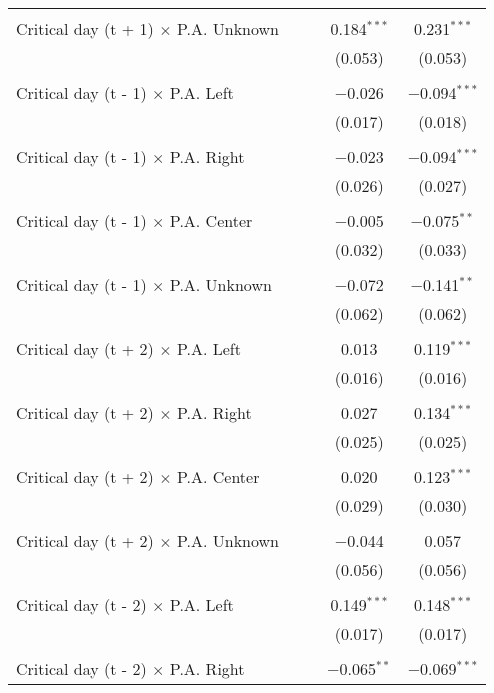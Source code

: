 \documentclass[
]{article}
\begin{document}
\begin{table}[!htbp]
{\begin{tabular}{@{\extracolsep{5pt}}lcccc}
  & & & & \\ 
 Critical day (t + 1) $\times$ P.A. Unknown &  &  & 0.184$^{***}$ & 0.231$^{***}$ \\ 
  &  &  & (0.053) & (0.053) \\ 
  & & & & \\ 
 Critical day (t - 1) $\times$ P.A. Left &  &  & $-$0.026 & $-$0.094$^{***}$ \\ 
  &  &  & (0.017) & (0.018) \\ 
  & & & & \\ 
 Critical day (t - 1) $\times$ P.A. Right &  &  & $-$0.023 & $-$0.094$^{***}$ \\ 
  &  &  & (0.026) & (0.027) \\ 
  & & & & \\ 
 Critical day (t - 1) $\times$ P.A. Center &  &  & $-$0.005 & $-$0.075$^{**}$ \\ 
  &  &  & (0.032) & (0.033) \\ 
  & & & & \\ 
 Critical day (t - 1) $\times$ P.A. Unknown &  &  & $-$0.072 & $-$0.141$^{**}$ \\ 
  &  &  & (0.062) & (0.062) \\ 
  & & & & \\ 
 Critical day (t + 2) $\times$ P.A. Left &  &  & 0.013 & 0.119$^{***}$ \\ 
  &  &  & (0.016) & (0.016) \\ 
  & & & & \\ 
 Critical day (t + 2) $\times$ P.A. Right &  &  & 0.027 & 0.134$^{***}$ \\ 
  &  &  & (0.025) & (0.025) \\ 
  & & & & \\ 
 Critical day (t + 2) $\times$ P.A. Center &  &  & 0.020 & 0.123$^{***}$ \\ 
  &  &  & (0.029) & (0.030) \\ 
  & & & & \\ 
 Critical day (t + 2) $\times$ P.A. Unknown &  &  & $-$0.044 & 0.057 \\ 
  &  &  & (0.056) & (0.056) \\ 
  & & & & \\ 
 Critical day (t - 2) $\times$ P.A. Left &  &  & 0.149$^{***}$ & 0.148$^{***}$ \\ 
  &  &  & (0.017) & (0.017) \\ 
  & & & & \\ 
 Critical day (t - 2) $\times$ P.A. Right &  &  & $-$0.065$^{**}$ & $-$0.069$^{***}$ \\ 

\end{tabular}}
\end{table}
\end{document}
